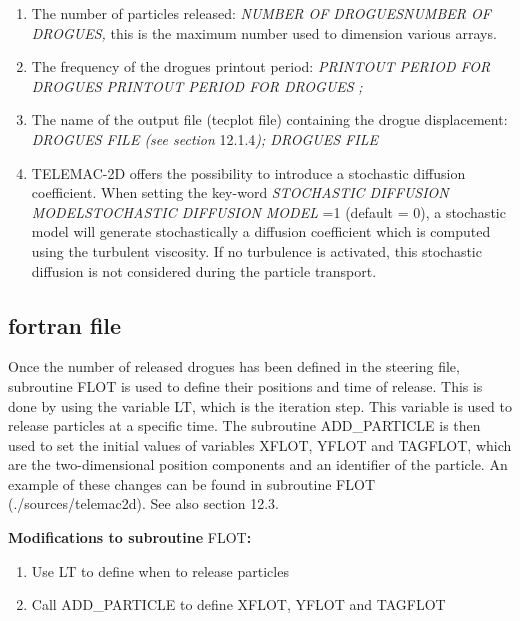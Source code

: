 \begin{enumerate}
\item  The number of particles released: \textit{NUMBER OF DROGUESNUMBER OF DROGUES, }this is the maximum number used to dimension various arrays.

\item  The frequency of the drogues printout period: \textit{PRINTOUT PERIOD FOR DROGUES PRINTOUT PERIOD FOR DROGUES} \textit{;}

\item  The name of the output file (tecplot file) containing the drogue displacement: \textit{DROGUES FILE (see section }12.1.4\textit{); DROGUES FILE} \textit{ }

\item  TELEMAC-2D offers the possibility to introduce a stochastic diffusion coefficient. When setting the key-word \textit{STOCHASTIC DIFFUSION MODELSTOCHASTIC DIFFUSION MODEL} =1 (default = 0), a stochastic model will generate stochastically a diffusion coefficient which is computed using the turbulent viscosity. If no turbulence is activated, this stochastic diffusion is not considered during the particle transport.
\end{enumerate}


\subsection{ fortran file}

 Once the number of released drogues has been defined in the steering file, subroutine FLOT is used to define their positions and time of release. This is done by using the variable LT, which is the iteration step. This variable is used to release particles at a specific time. The subroutine ADD\_PARTICLE is then used to set the initial values of variables XFLOT, YFLOT and TAGFLOT, which are the two-dimensional position components and an identifier of the particle. An example of these changes can be found in subroutine FLOT (./sources/telemac2d). See also section 12.3.

 \textbf{Modifications to subroutine }FLOT\textbf{:}

\begin{enumerate}
\item \textbf{ }Use LT to define when to release particles

\item  Call ADD\_PARTICLE to define XFLOT, YFLOT and TAGFLOT
\end{enumerate}


